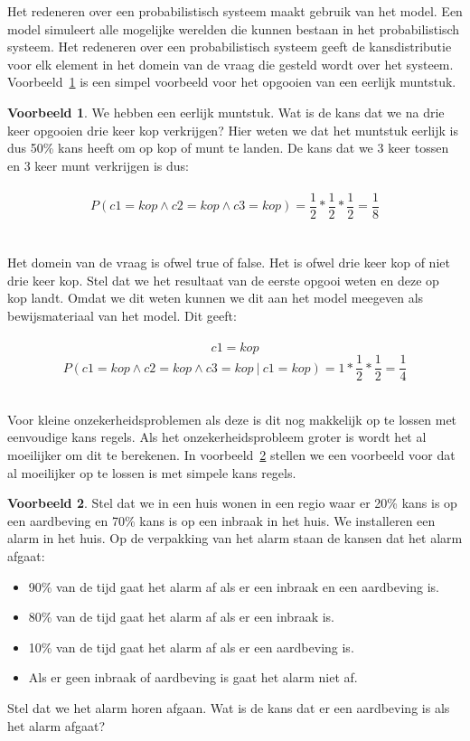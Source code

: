 \documentclass[12pt,a4paper,oneside]{book}
\theoremstyle{definition}
\newtheorem{exmp}{Voorbeeld}[section]
\newcommand\given[1][]{\:#1\vert\:}
\begin{document}
Het redeneren over een probabilistisch systeem maakt gebruik van het model. Een model simuleert alle mogelijke werelden die kunnen bestaan in het probabilistisch systeem. Het redeneren over een probabilistisch systeem geeft de kansdistributie voor elk element in het domein van de vraag die gesteld wordt over het systeem. Voorbeeld~\ref{exmp:inferentiaexample} is een simpel voorbeeld voor het opgooien van een eerlijk muntstuk.
\begin{exmp}
\label{exmp:inferentiaexample}
We hebben een eerlijk muntstuk. Wat is de kans dat we na drie keer opgooien drie keer kop verkrijgen? Hier weten we dat het muntstuk eerlijk is dus 50\% kans heeft om op kop of munt te landen. De kans dat we 3 keer tossen en 3 keer munt verkrijgen is dus:
\\\\
\[
P(c1=kop \wedge c2=kop \wedge c3=kop) = \frac{1}{2} * \frac{1}{2} * \frac{1}{2} = \frac{1}{8}
\]
\\\\
Het domein van de vraag is ofwel true of false. Het is ofwel drie keer kop of niet drie keer kop. Stel dat we het resultaat van de eerste opgooi weten en deze op kop landt. Omdat we dit weten kunnen we dit aan het model meegeven als bewijsmateriaal van het model. Dit geeft:
\\\\
\[
c1 = \mathit{kop}
\]
\[
P(c1=kop \wedge c2=kop \wedge c3=kop \given[\big] c1 = kop) = 1 * \frac{1}{2} * \frac{1}{2} = \frac{1}{4}
\]
\\

\end{exmp}
Voor kleine onzekerheidsproblemen als deze is dit nog makkelijk op te lossen met eenvoudige kans regels. Als het onzekerheidsprobleem groter is wordt het al moeilijker om dit te berekenen. In voorbeeld~\ref{exmp:inferentiaexamplealarm} stellen we een voorbeeld voor dat al moeilijker op te lossen is met simpele kans regels.
\begin{exmp}
\label{exmp:inferentiaexamplealarm}
Stel dat we in een huis wonen in een regio waar er 20\% kans is op een aardbeving en 70\% kans is op een inbraak in het huis. We installeren een alarm in het huis. Op de verpakking van het alarm staan de kansen dat het alarm afgaat:
\begin{itemize}
	\item 90\% van de tijd gaat het alarm af als er een inbraak en een aardbeving is.
	\item 80\% van de tijd gaat het alarm af als er een inbraak is.
	\item 10\% van de tijd gaat het alarm af als er een aardbeving is.
	\item Als er geen inbraak of aardbeving is gaat het alarm niet af.
\end{itemize} 
Stel dat we het alarm horen afgaan. Wat is de kans dat er een aardbeving is als het alarm afgaat?
\end{exmp}
\end{document}
